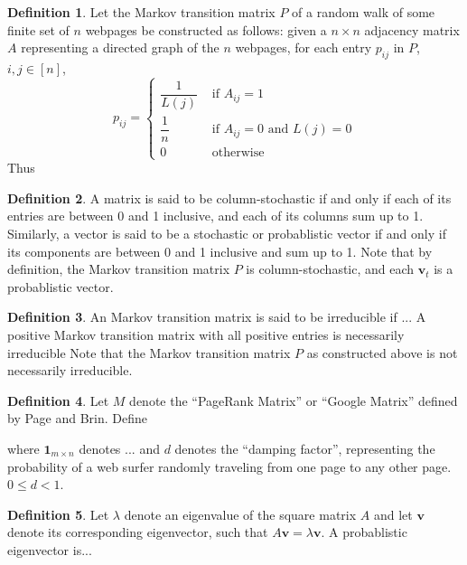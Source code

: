 \documentclass[11pt]{article}
\theoremstyle{definition}
\newtheorem{definition}{Definition}
\renewcommand{\vec}[1]{\mathbf{#1}}
\begin{document}
\begin{definition}
    Let the Markov transition matrix $P$ of a random walk of some finite set of $n$ webpages be constructed as follows:
    given a $n \times n$ adjacency matrix $A$ representing a directed graph of the $n$ webpages,
    for each entry $p_{ij}$ in $P$, $i,j \in [n]$,
    $$ p_{ij} = \begin{cases}
        \dfrac{1}{L(j)} & \text{ if } A_{ij} = 1 \\
        \dfrac{1}{n} & \text{ if } A_{ij} = 0 \text{ and } L(j) = 0 \\
        0 & \text{ otherwise }
    \end{cases}$$
    Thus 
\end{definition}

\begin{definition}
    A matrix is said to be column-stochastic if and only if each of its entries are between 0 and 1 inclusive, and each of its columns sum up to 1.
    Similarly, a vector is said to be a stochastic or probablistic vector if and only if its components are between 0 and 1 inclusive and sum up to 1.
    Note that by definition, the Markov transition matrix $P$ is column-stochastic, and each $\vec{v}_t$ is a probablistic vector.
\end{definition}

\begin{definition}
    An Markov transition matrix is said to be irreducible if ...
    A positive Markov transition matrix with all positive entries is necessarily irreducible
    Note that the Markov transition matrix $P$ as constructed above is not necessarily irreducible.
\end{definition}

\begin{definition}
    Let $M$ denote the ``PageRank Matrix'' or ``Google Matrix'' defined by Page and Brin.
    Define 

    where $\vec{1}_{m \times n}$ denotes ...
    and $d$ denotes the ``damping factor'', representing the probability of a web surfer randomly traveling from one page to any other page. $0 \leq d < 1$.
\end{definition}

\begin{definition}
    Let $\lambda$ denote an eigenvalue of the square matrix $A$ and let $\vec{v}$ denote its corresponding eigenvector, such that $A \vec{v} = \lambda \vec{v}$.
    A probablistic eigenvector is...
\end{definition}
\end{document}
